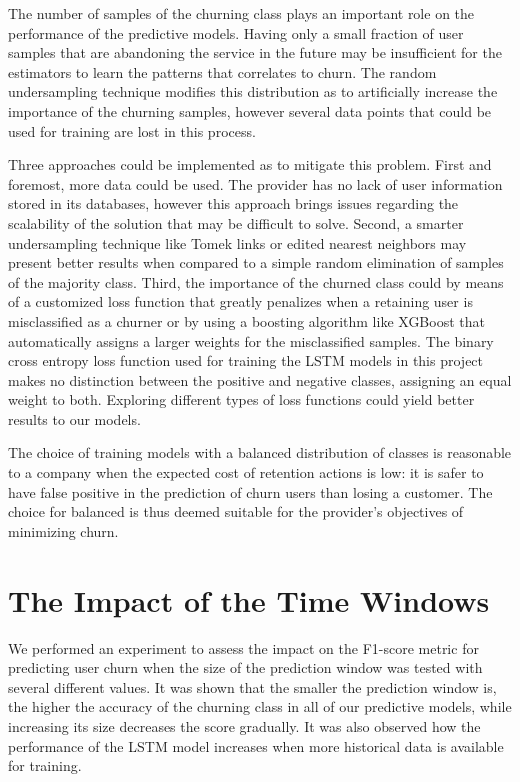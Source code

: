 \documentclass{kththesis}
\begin{document}
The number of samples of the churning class plays an important role on the performance of the predictive models. Having only a small fraction of user samples that are abandoning the service in the future may be insufficient for the estimators to learn the patterns that correlates to churn. The random undersampling technique modifies this distribution as to artificially increase the importance of the churning samples, however several data points that could be used for training are lost in this process. 

Three approaches could be implemented as to mitigate this problem. First and foremost, more data could be used. The provider has no lack of user information stored in its databases, however this approach brings issues regarding the scalability of the solution that may be difficult to solve. Second, a smarter undersampling technique like Tomek links \citep{tomek1976two} or edited nearest neighbors \citep{smith2014instance} may present better results when compared to a simple random elimination of samples of the majority class. Third, the importance of the churned class could by means of a customized loss function that greatly penalizes when a retaining user is misclassified as a churner or by using a boosting algorithm like XGBoost \citep{chen2016xgboost} that automatically assigns a larger weights for the misclassified samples. The binary cross entropy loss function used for training the LSTM models in this project makes no distinction between the positive and negative classes, assigning an equal weight to both. Exploring different types of loss functions could yield better results to our models.

The choice of training models with a balanced distribution of classes is reasonable to a company when the expected cost of retention actions is low: it is safer to have false positive in the prediction of churn users than losing a customer. The choice for balanced is thus deemed suitable for the provider's objectives of minimizing churn. 

\section{The Impact of the Time Windows}
\label{sec:dis_time_windows}

We performed an experiment to assess the impact on the F1-score metric for predicting user churn when the size of the prediction window was tested with several different values. It was shown that the smaller the prediction window is, the higher the accuracy of the churning class in all of our predictive models, while increasing its size decreases the score gradually. It was also observed how the performance of the LSTM model increases when more historical data is available for training.
\end{document}
